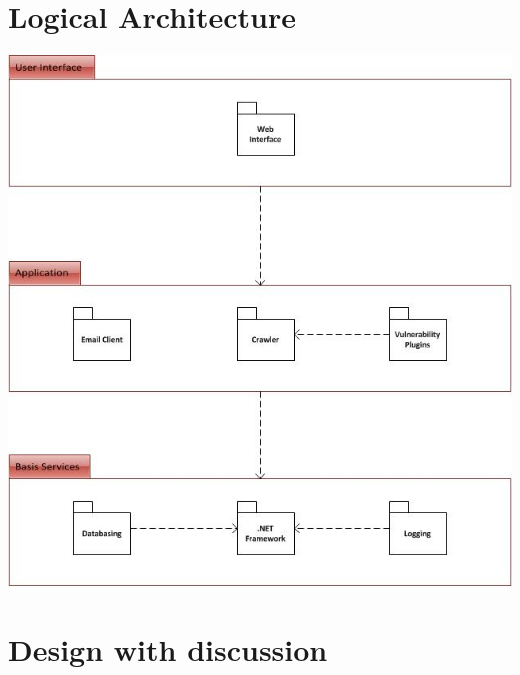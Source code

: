 \documentclass{article}
\begin{document}
\section{Logical Architecture}
\includegraphics{LogArch}
\newpage
\section{Design with discussion}
\end{document}
